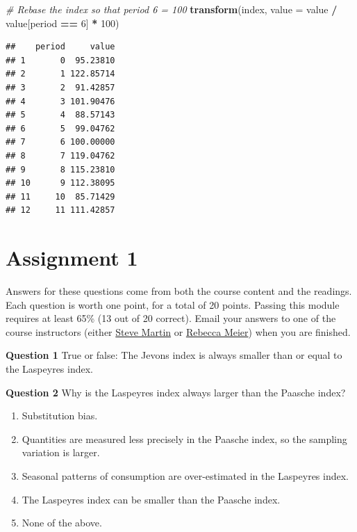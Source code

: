 \documentclass[]{article}
\newenvironment{Shaded}{\begin{snugshade}}{\end{snugshade}}
\newcommand{\CommentTok}[1]{\textcolor[rgb]{0.56,0.35,0.01}{\textit{#1}}}
\newcommand{\DataTypeTok}[1]{\textcolor[rgb]{0.13,0.29,0.53}{#1}}
\newcommand{\DecValTok}[1]{\textcolor[rgb]{0.00,0.00,0.81}{#1}}
\newcommand{\KeywordTok}[1]{\textcolor[rgb]{0.13,0.29,0.53}{\textbf{#1}}}
\newcommand{\NormalTok}[1]{#1}
\newcommand{\OperatorTok}[1]{\textcolor[rgb]{0.81,0.36,0.00}{\textbf{#1}}}
\newcommand{\StringTok}[1]{\textcolor[rgb]{0.31,0.60,0.02}{#1}}
\begin{document}
\begin{Shaded}
\begin{Highlighting}[]
\CommentTok{# Rebase the index so that period 6 = 100}
\KeywordTok{transform}\NormalTok{(index, }\DataTypeTok{value =}\NormalTok{ value }\OperatorTok{/}\StringTok{ }\NormalTok{value[period }\OperatorTok{==}\StringTok{ }\DecValTok{6}\NormalTok{] }\OperatorTok{*}\StringTok{ }\DecValTok{100}\NormalTok{)}
\end{Highlighting}
\end{Shaded}

\begin{verbatim}
##    period     value
## 1       0  95.23810
## 2       1 122.85714
## 3       2  91.42857
## 4       3 101.90476
## 5       4  88.57143
## 6       5  99.04762
## 7       6 100.00000
## 8       7 119.04762
## 9       8 115.23810
## 10      9 112.38095
## 11     10  85.71429
## 12     11 111.42857
\end{verbatim}

\hypertarget{assignment-1}{%
\section{Assignment 1}\label{assignment-1}}

Answers for these questions come from both the course content and the readings. Each question is worth one point, for a total of 20 points. Passing this module requires at least 65\% (13 out of 20 correct). Email your answers to one of the course instructors (either \href{mailto:steve.martin5@canada.ca}{Steve Martin} or \href{mailto:rebecca.meier@canada.ca}{Rebecca Meier}) when you are finished.

\textbf{Question 1} True or false: The Jevons index is always smaller than or equal to the Laspeyres index.

\textbf{Question 2} Why is the Laspeyres index always larger than the Paasche index?

\begin{enumerate}
\def\labelenumi{\alph{enumi})}
\item
  Substitution bias.
\item
  Quantities are measured less precisely in the Paasche index, so the sampling variation is
  larger.
\item
  Seasonal patterns of consumption are over-estimated in the Laspeyres index.
\item
  The Laspeyres index can be smaller than the Paasche index.
\item
  None of the above.
\end{enumerate}
\end{document}
